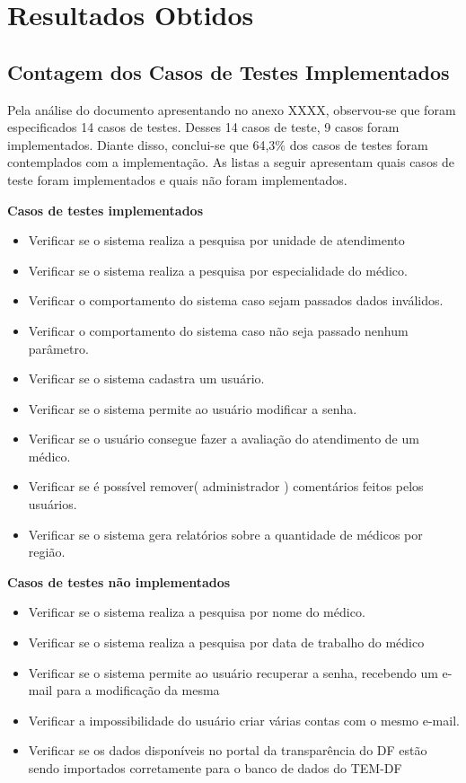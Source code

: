 \chapter[Resultados Obtidos]{Resultados Obtidos}

\section{Contagem dos Casos de Testes Implementados}
\label{sec:contagem-casos}
Pela análise do documento apresentando no anexo XXXX, observou-se que  foram especificados 14 casos de testes. Desses 14 casos de teste, 9 casos foram implementados. Diante disso, conclui-se que 64,3\% dos casos de testes foram contemplados com a implementação. As listas a seguir apresentam quais casos de teste foram implementados e quais não foram implementados.

\textbf{Casos de testes implementados}
\begin{itemize}
	\item Verificar se o sistema realiza a pesquisa por unidade de atendimento
	\item Verificar se o sistema realiza a pesquisa por especialidade do médico.
	\item Verificar o comportamento do sistema caso sejam passados dados inválidos.
	\item Verificar o comportamento do sistema caso não seja passado nenhum parâmetro.
	\item Verificar se o sistema cadastra um usuário.
	\item Verificar se o sistema permite ao usuário modificar a senha.
	\item Verificar se o usuário consegue fazer a avaliação do atendimento de um médico.
	\item Verificar se é possível remover( administrador ) comentários feitos pelos usuários.
	\item Verificar se o sistema gera relatórios sobre a quantidade de médicos por região.
\end{itemize}

\textbf{Casos de testes não implementados}
\begin{itemize}
	\item Verificar se o sistema realiza a pesquisa por nome do médico.
	\item Verificar se o sistema realiza a pesquisa por data de trabalho do médico
	\item Verificar se o sistema permite ao usuário recuperar a senha, recebendo um e-mail para a modificação da mesma
	\item Verificar a impossibilidade do usuário criar várias contas com o mesmo e-mail. 
	\item Verificar se os dados disponíveis no portal da transparência do DF estão sendo importados corretamente para o banco de dados do TEM-DF
\end{itemize}


